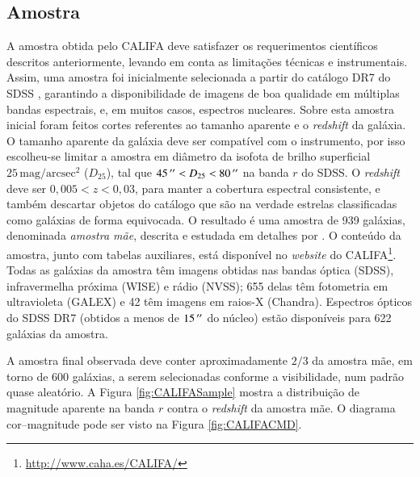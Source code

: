 \subsection{Amostra}

A amostra obtida pelo CALIFA deve satisfazer os requerimentos científicos
descritos anteriormente, levando em conta as limitações técnicas e
instrumentais. Assim, uma amostra foi inicialmente selecionada a partir do
catálogo DR7 do SDSS \citep{Abazajian2009}, garantindo a disponibilidade de
imagens de boa qualidade em múltiplas bandas espectrais, e, em muitos casos,
espectros nucleares. Sobre esta amostra inicial foram feitos cortes referentes
ao tamanho aparente e o {\em redshift} da galáxia. O tamanho aparente da galáxia
deve ser compatível com o instrumento, por isso escolheu-se limitar a amostra em
diâmetro da isofota de brilho superficial $25\,\mathrm{mag}/\mathrm{arcsec}^2$
($D_{25}$), tal que $45\,^{\prime\prime} < D_{25} < 80\,^{\prime\prime}$ na banda $r$ do SDSS. O
{\em redshift} deve ser $0,005 < z < 0,03$, para manter a cobertura espectral
consistente, e também descartar objetos do catálogo que são na verdade estrelas
classificadas como galáxias de forma equivocada.
O resultado é uma amostra de 939 galáxias, denominada {\em amostra mãe},
descrita e estudada em detalhes por \citet{Walcher2014}. O conteúdo da amostra,
junto com tabelas auxiliares, está disponível no {\em website} do
CALIFA\footnote{\url{http://www.caha.es/CALIFA/}}. Todas as galáxias da amostra
têm imagens obtidas nas bandas óptica (SDSS), infravermelha próxima (WISE) e
rádio (NVSS); 655 delas têm fotometria em ultravioleta (GALEX) e 42 têm imagens
em raios-X (Chandra). Espectros ópticos do SDSS DR7 (obtidos a menos de
$15\,^{\prime\prime}$ do núcleo) estão disponíveis para 622 galáxias da amostra.

A amostra final observada deve conter aproximadamente $2/3$ da amostra mãe, em
torno de 600 galáxias, a serem selecionadas conforme a visibilidade, num padrão
quase aleatório. A Figura \ref{fig:CALIFASample} mostra a distribuição de
magnitude aparente na banda $r$ contra o {\em redshift} da amostra mãe. O
diagrama cor--magnitude pode ser visto na Figura \ref{fig:CALIFACMD}.

